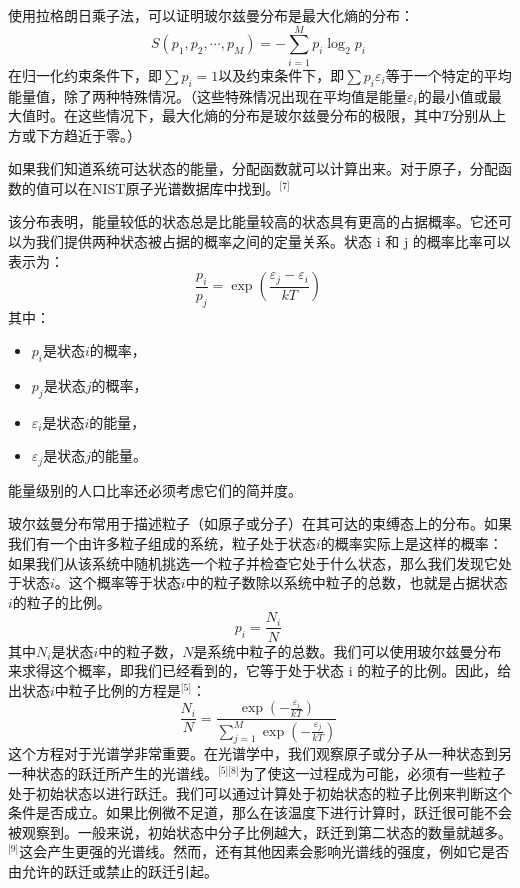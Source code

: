 使用拉格朗日乘子法，可以证明玻尔兹曼分布是最大化熵的分布：
\[
S(p_1, p_2, \cdots, p_M) = -\sum_{i=1}^{M} p_i \log_2 p_i~
\]
在归一化约束条件下，即\(\sum p_i = 1\)以及约束条件下，即\(\sum p_i \varepsilon_i\)等于一个特定的平均能量值，除了两种特殊情况。（这些特殊情况出现在平均值是能量\(\varepsilon_i\)的最小值或最大值时。在这些情况下，最大化熵的分布是玻尔兹曼分布的极限，其中\(T\)分别从上方或下方趋近于零。）

如果我们知道系统可达状态的能量，分配函数就可以计算出来。对于原子，分配函数的值可以在NIST原子光谱数据库中找到。\(^\text{[7]}\)

该分布表明，能量较低的状态总是比能量较高的状态具有更高的占据概率。它还可以为我们提供两种状态被占据的概率之间的定量关系。状态 i 和 j 的概率比率可以表示为：
\[
\frac{p_i}{p_j} = \exp \left( \frac{\varepsilon_j - \varepsilon_i}{kT} \right)~
\]
其中：
\begin{itemize}
\item \( p_i \)是状态\(i\)的概率，  
\item \( p_j \)是状态\(j\)的概率，  
\item \( \varepsilon_i \)是状态\(i\)的能量，  
\item \( \varepsilon_j \)是状态\(j\)的能量。
\end{itemize}
能量级别的人口比率还必须考虑它们的简并度。

玻尔兹曼分布常用于描述粒子（如原子或分子）在其可达的束缚态上的分布。如果我们有一个由许多粒子组成的系统，粒子处于状态\(i\)的概率实际上是这样的概率：如果我们从该系统中随机挑选一个粒子并检查它处于什么状态，那么我们发现它处于状态\(i\)。这个概率等于状态\(i\)中的粒子数除以系统中粒子的总数，也就是占据状态\(i\)的粒子的比例。
\[
p_i = \frac{N_i}{N}~
\]
其中\( N_i \)是状态\(i\)中的粒子数，\( N \)是系统中粒子的总数。我们可以使用玻尔兹曼分布来求得这个概率，即我们已经看到的，它等于处于状态 i 的粒子的比例。因此，给出状态\(i\)中粒子比例的方程是\(^\text{[5]}\)：
\[
\frac{N_i}{N} = \frac{\exp \left( -\frac{\varepsilon_i}{kT} \right)}{\sum_{j=1}^{M} \exp \left( -\frac{\varepsilon_j}{kT} \right)}~
\]
这个方程对于光谱学非常重要。在光谱学中，我们观察原子或分子从一种状态到另一种状态的跃迁所产生的光谱线。\(^\text{[5][8]}\)为了使这一过程成为可能，必须有一些粒子处于初始状态以进行跃迁。我们可以通过计算处于初始状态的粒子比例来判断这个条件是否成立。如果比例微不足道，那么在该温度下进行计算时，跃迁很可能不会被观察到。一般来说，初始状态中分子比例越大，跃迁到第二状态的数量就越多。\(^\text{[9]}\)这会产生更强的光谱线。然而，还有其他因素会影响光谱线的强度，例如它是否由允许的跃迁或禁止的跃迁引起。

